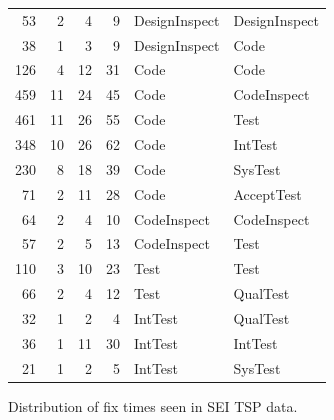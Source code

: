 \documentclass{sig-alternate}
\begin{document}
\begin{figure}[!t]
\begin{center}
\begin{tabular}{r|rrr|ll}
53& 2& 4& 9&  DesignInspect&DesignInspect\\
38& 1& 3& 9&  DesignInspect&Code\\\hline

126& 4& 12& 31&  Code&Code\\
459& 11& 24& 45&  Code&CodeInspect\\
461& 11& 26& 55&  Code&Test\\
348& 10& 26& 62&  Code&IntTest\\
230& 8& 18& 39&  Code&SysTest\\
71& 2& 11& 28&  Code&AcceptTest\\\hline

64& 2& 4& 10&  CodeInspect&CodeInspect\\
57& 2& 5& 13&  CodeInspect&Test\\\hline



110& 3& 10& 23&  Test&Test\\
66& 2& 4& 12&  Test&QualTest\\\hline


32& 1& 2& 4&  IntTest&QualTest\\
36& 1& 11& 30&  IntTest&IntTest\\
21& 1& 2& 5&  IntTest&SysTest\\
 \end{tabular}
\end{center}
\caption{Distribution of fix times seen in SEI TSP data.}
\label{fig:faw}
\end{figure}
 
\end{document}
